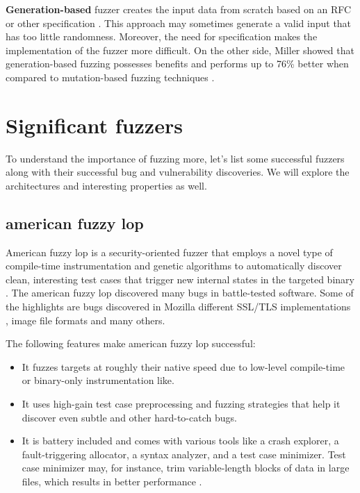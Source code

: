 \textbf{Generation-based} fuzzer creates the input data from scratch based on an RFC or other specification \cite{miller2007analysis}. This approach may sometimes generate a valid input that has too little randomness. Moreover, the need for specification makes the implementation of the fuzzer more difficult. On the other side, Miller showed that generation-based fuzzing possesses benefits and performs up to 76\% better when compared to mutation-based fuzzing techniques \cite{miller2007analysis}.


\section{Significant fuzzers}
\label{ssub:Significant fuzzers}
To understand the importance of fuzzing more, let's list some successful fuzzers along with their successful bug and vulnerability discoveries. We will explore the architectures and interesting properties as well.

\subsection{american fuzzy lop}
American fuzzy lop is a security-oriented fuzzer that employs a novel type of compile-time instrumentation and genetic algorithms to automatically discover clean, interesting test cases that trigger new internal states in the targeted binary \cite{zalewski2018american}. The american fuzzy lop discovered many bugs in battle-tested software. Some of the highlights are bugs discovered in Mozilla \cite{zalewski2014uninitialized, zalewski2014two, zalewski2015uninitialized, mozzilla2015update} different SSL/TLS implementations \cite{bock2015out, sharma2014gnutls}, image file formats \cite{zalewski2013ijg, cunningham2014segv} and many others.

The following features make american fuzzy lop successful:
\begin{itemize}
    \item It fuzzes targets at roughly their native speed due to low-level compile-time or binary-only instrumentation like.
    \item It uses high-gain test case preprocessing and fuzzing strategies that help it discover even subtle and other hard-to-catch bugs.
    \item It is battery included and comes with various tools like a crash explorer, a fault-triggering allocator, a syntax analyzer, and a test case minimizer. Test case minimizer may, for instance, trim variable-length blocks of data in large files, which results in better performance \cite{afl2019docs}.
\end{itemize}

